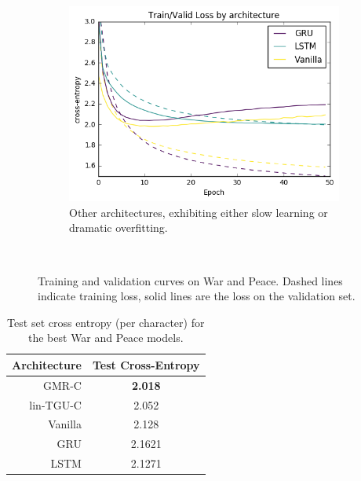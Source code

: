 \begin{figure}
\begin{subfigure}[t]{0.3\textwidth}
	\centering
	\includegraphics[width=\textwidth]{exps/wp/others}
	\caption{Other architectures, exhibiting either slow learning or dramatic overfitting.}
\end{subfigure}~
\caption{Training and validation curves on War and Peace. 
		 Dashed lines indicate training loss, solid lines are the loss on the validation set.}
\label{fig:wp}
\end{figure}

\begin{table}
\begin{tabu} to \textwidth {r||c}
Architecture & Test Cross-Entropy \\
\hline
GMR-C & \textbf{2.018} \\ %
lin-TGU-C & 2.052 \\ %
\hline
Vanilla & 2.128 \\ %
GRU & 2.1621 \\ %
LSTM & 2.1271 \\%
\hline
\end{tabu}
\caption{Test set cross entropy (per character) for the best War and Peace models.}
\label{tab:wptest}
\end{table}
